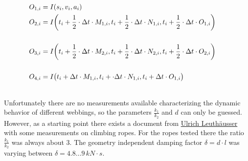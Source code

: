 \begin{align}
O_{1,i} &= I (s_i, v_i, a_i) \\
O_{2,i} &\begin{multlined}[t]= I \biggl(t_i + \frac{1}{2} \cdot \Delta t \cdot M_{1,i}, t_i + \frac{1}{2} \cdot \Delta t \cdot N_{1,i}, t_i + \insertForSmartphone{\\} \frac{1}{2} \cdot \Delta t \cdot O_{1,i}\biggr)\ \\ \end{multlined} \\
O_{3,i} &\begin{multlined}[t]= I \biggl(t_i + \frac{1}{2} \cdot \Delta t \cdot M_{2,i}, t_i + \frac{1}{2} \cdot \Delta t \cdot N_{2,i}, t_i + \insertForSmartphone{\\} \frac{1}{2} \cdot \Delta t \cdot O_{2,i}\biggr)\\ \end{multlined} \\
O_{4,i} &\begin{multlined}[t]= I \bigl(t_i +  \Delta t \cdot M_{1,i}, t_i + \cdot \Delta t \cdot N_{1,i}, t_i + \insertForSmartphone{\\} \Delta t \cdot O_{1,i}\bigr)\\ \end{multlined}
\end{align}


Unfortunately there are no measurements available characterizing the dynamic behavior of different webbings, so the parameters $\frac{k_1}{k_2}$ and $d$ can only be guessed. However, as a starting point there exists a document from \href{http://www.sigmadewe.com/fileadmin/user\_upload/pdf-Dateien/SEILPHYSIK.pdf}{Ulrich Leuthäusser} with some measurements on climbing ropes.
For the ropes tested there the ratio $\frac{k_1}{k_2}$ was always about $3$. The geometry independent damping factor $\delta = d \cdot l$ was varying between $\delta = 4.8 \dots 9\,kN\cdot s$.
